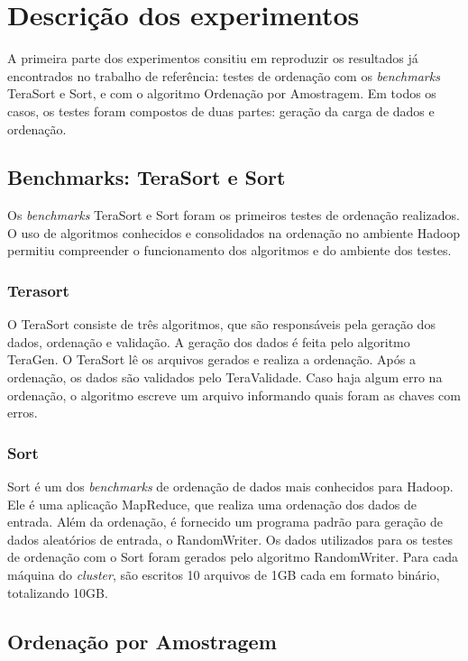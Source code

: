 \section{Descrição dos experimentos}

A primeira parte dos experimentos consitiu em reproduzir os resultados já encontrados no trabalho de referência: testes de ordenação com os \textit{benchmarks} TeraSort e Sort, e com o algoritmo Ordenação por Amostragem. 
Em todos os casos, os testes foram compostos de duas partes: geração da carga de dados e ordenação. 

\subsection{Benchmarks: TeraSort e Sort}

Os \textit{benchmarks} TeraSort e Sort foram os primeiros testes de ordenação realizados. O uso de algoritmos conhecidos e consolidados na ordenação no ambiente Hadoop permitiu compreender o funcionamento dos algoritmos e do ambiente dos testes.

\subsubsection{Terasort}

O TeraSort consiste de três algoritmos, que são responsáveis pela geração dos dados, ordenação e validação. 
A geração dos dados é feita pelo algoritmo TeraGen. O TeraSort lê os arquivos gerados e realiza a ordenação. Após a ordenação, os dados são validados pelo TeraValidade. Caso haja algum erro na ordenação, o algoritmo escreve um arquivo informando quais foram as chaves com erros.  

\subsubsection{Sort}

Sort é um dos \textit{benchmarks}  de ordenação de dados mais conhecidos para Hadoop. Ele é uma aplicação MapReduce, que realiza uma ordenação dos dados de entrada. Além da ordenação, é fornecido um programa padrão para geração de dados aleatórios de entrada, o RandomWriter. 
Os dados utilizados para os testes de ordenação com o Sort foram gerados pelo algoritmo RandomWriter. Para cada máquina do \textit{cluster}, são escritos 10 arquivos de 1GB cada em formato binário, totalizando 10GB.


\subsection{Ordenação por Amostragem}

